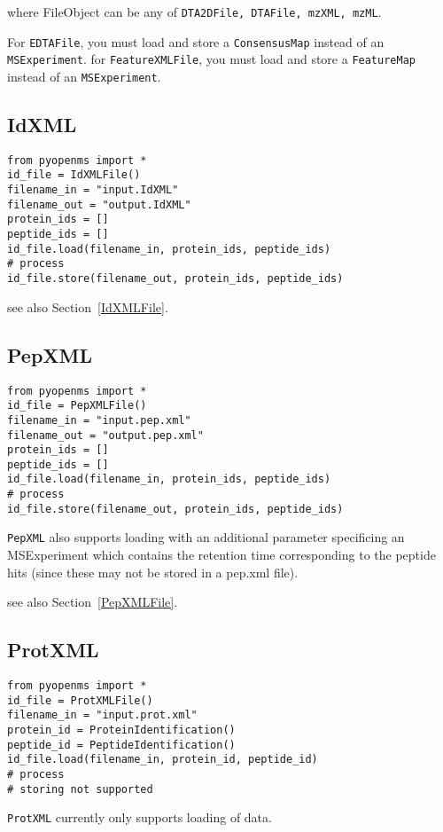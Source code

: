 \documentclass[10pt]{article}
\begin{document}
where FileObject can be any of \texttt{DTA2DFile, DTAFile, mzXML, mzML}.

For \texttt{EDTAFile}, you must load and store a \texttt{ConsensusMap} instead
of an \texttt{MSExperiment}.
for \texttt{FeatureXMLFile}, you must load and store a \texttt{FeatureMap} instead
of an \texttt{MSExperiment}.


\subsection{IdXML}
\begin{verbatim}
from pyopenms import *
id_file = IdXMLFile()
filename_in = "input.IdXML"
filename_out = "output.IdXML"
protein_ids = []
peptide_ids = []
id_file.load(filename_in, protein_ids, peptide_ids)
# process
id_file.store(filename_out, protein_ids, peptide_ids)
\end{verbatim}

see also Section~\ref{IdXMLFile}.

\subsection{PepXML}
\begin{verbatim}
from pyopenms import *
id_file = PepXMLFile()
filename_in = "input.pep.xml"
filename_out = "output.pep.xml"
protein_ids = []
peptide_ids = []
id_file.load(filename_in, protein_ids, peptide_ids)
# process
id_file.store(filename_out, protein_ids, peptide_ids)
\end{verbatim}

\texttt{PepXML} also supports loading with an additional parameter specificing
an MSExperiment which contains the retention time corresponding to the peptide
hits (since these may not be stored in a pep.xml file).

see also Section~\ref{PepXMLFile}.

\subsection{ProtXML}
\begin{verbatim}
from pyopenms import *
id_file = ProtXMLFile()
filename_in = "input.prot.xml"
protein_id = ProteinIdentification()
peptide_id = PeptideIdentification()
id_file.load(filename_in, protein_id, peptide_id)
# process
# storing not supported
\end{verbatim}

\texttt{ProtXML} currently only supports loading of data.
\end{document}
